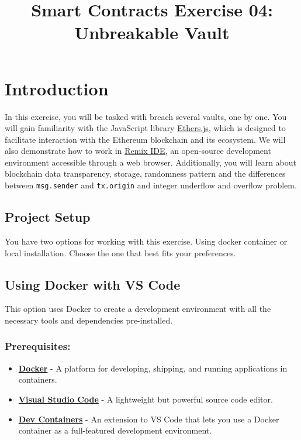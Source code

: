 \documentclass[12pt]{article}
\title{Smart Contracts Exercise 04: \\ Unbreakable Vault}
\author{}
\date{}
\begin{document}
\maketitle
\section{Introduction}
In this exercise, you will be tasked with breach several vaults, one by one. You will gain familiarity with the JavaScript library \href{https://docs.ethers.org/v6}{Ethers.js}, which is designed to facilitate interaction with the Ethereum blockchain and its ecosystem. We will also demonstrate how to work in \href{https://remix.ethereum.org/}{Remix IDE}, an open-source development environment accessible through a web browser. Additionally, you will learn about blockchain data transparency, storage, randomness pattern and the differences between \texttt{msg.sender} and \texttt{tx.origin} and integer underflow and overflow problem.

\subsection*{Project Setup}

You have two options for working with this exercise. Using docker container or local installation. Choose the one that best fits your preferences.

\subsection{Using Docker with VS Code}

This option uses Docker to create a development environment with all the necessary tools and dependencies pre-installed.

\subsubsection*{Prerequisites:}

\begin{itemize}
    \item \textbf{\href{https://www.docker.com/products/docker-desktop}{Docker}} - A platform for developing, shipping, and running applications in containers.
    \item \textbf{\href{https://code.visualstudio.com/}{Visual Studio Code}} - A lightweight but powerful source code editor.
    \item \textbf{\href{https://marketplace.visualstudio.com/items?itemName=ms-vscode-remote.remote-containers}{Dev Containers}} - An extension to VS Code that lets you use a Docker container as a full-featured development environment.
\end{itemize}
\end{document}
